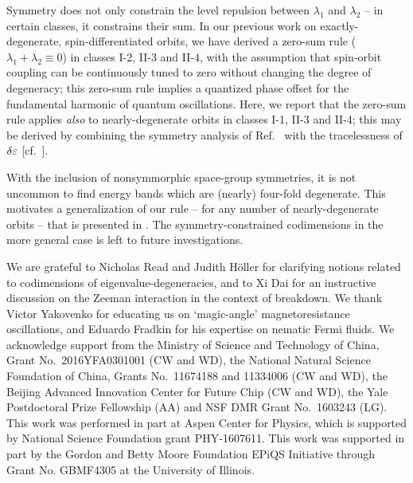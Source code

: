 \documentclass[aps, showpacs, twocolumn, notitlepage, superscriptaddress]{revtex4-1}
\begin{document}
Symmetry does not only constrain the level repulsion between $\lambda_1$ and $\lambda_2$ -- in certain classes, it constrains their sum. In our previous work on exactly-degenerate, spin-differentiated orbits\cite{100p,topoferm}, we have derived a zero-sum rule ($\lambda_1{+}\lambda_2{\equiv}0$) in classes I-2, II-3 and II-4, with the assumption that spin-orbit coupling can be continuously tuned to zero without changing the degree of degeneracy; this zero-sum rule implies a quantized phase offset for the fundamental harmonic of quantum oscillations\cite{topoferm}. Here, we report that the zero-sum rule applies \textit{also} to nearly-degenerate orbits in classes I-1, II-3 and II-4; this may be derived by combining the symmetry analysis of Ref.\  with the tracelessness of $\delta\varepsilon$ [cf.\ ]. 


With the inclusion of nonsymmorphic space-group symmetries, it is not uncommon to find energy bands which are (nearly) four-fold degenerate\cite{michel_elementary_2001,wang_hourglass_2016,bradlyn_topological_2017}. This motivates a generalization of our rule -- for any number of nearly-degenerate orbits -- that is presented in . The symmetry-constrained codimensions in the more general case is left to future investigations. 

\begin{acknowledgments}

We are grateful to Nicholas Read and Judith H\"oller for clarifying notions related to codimensions of eigenvalue-degeneracies, and to Xi Dai for an instructive discussion on the Zeeman interaction in the context of breakdown. We thank Victor Yakovenko for  educating us on `magic-angle' magnetoresistance oscillations, and  Eduardo Fradkin for his expertise on nematic Fermi fluids.  We acknowledge support from the Ministry of Science and Technology of China, Grant No.\ 2016YFA0301001 (CW and WD), the National Natural Science Foundation of China, Grants No.\ 11674188 and 11334006 (CW and WD), the Beijing Advanced Innovation Center for Future Chip (CW and WD), the Yale Postdoctoral Prize Fellowship (AA) and NSF DMR Grant No.\ 1603243 (LG). This work was performed in part at Aspen Center for Physics, which is supported by National Science Foundation grant PHY-1607611. This work was supported in part by the Gordon and Betty Moore Foundation EPiQS Initiative through Grant No. GBMF4305 at the University of Illinois.\\
\end{acknowledgments}
\end{document}
